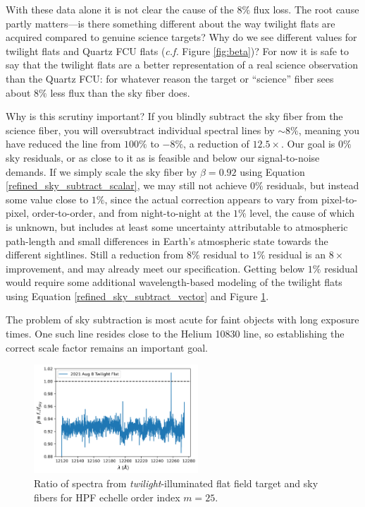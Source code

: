\documentclass[modern]{aastex631}
\begin{document}
With these data alone it is not clear the cause of the $8\%$ flux loss.  The root cause partly matters---is there something different about the way twilight flats are acquired compared to genuine science targets?  Why do we see different values for twilight flats and Quartz FCU flats (\emph{c.f.} Figure \ref{fig:beta})?  For now it is safe to say that the twilight flats are a better representation of a real science observation than the Quartz FCU: for whatever reason the target or ``science'' fiber sees about $8\%$ less flux than the sky fiber does.  

Why is this scrutiny important?  If you blindly subtract the sky fiber from the science fiber, you will oversubtract individual spectral lines by $\sim8\%$, meaning you have reduced the line from $100\%$ to $-8\%$, a reduction of $12.5\times$.  Our goal is $0\%$ sky residuals, or as close to it as is feasible and below our signal-to-noise demands.  If we simply scale the sky fiber by $\beta=0.92$ using Equation \ref{refined_sky_subtract_scalar}, we may still not achieve $0\%$ residuals, but instead some value close to $1\%$, since the actual correction appears to vary from pixel-to-pixel, order-to-order, and from night-to-night at the $1\%$ level, the cause of which is unknown, but includes at least some uncertainty attributable to atmospheric path-length and small differences in Earth's atmospheric state towards the different sightlines.  Still a reduction from $8\%$ residual to $1\%$ residual is an $8\times$ improvement, and may already meet our specification.  Getting below $1\%$ residual would require some additional wavelength-based modeling of the twilight flats using Equation \ref{refined_sky_subtract_vector} and Figure \ref{fig:beta_twilight}.

The problem of sky subtraction is most acute for faint objects with long exposure times.  One such line resides close to the Helium 10830 line, so establishing the correct scale factor remains an important goal.

\begin{figure}[ht]
  \centering
  \includegraphics[width=0.55\textwidth]{figures/HPF_twilight_2021Aug8.png}
\caption{Ratio of spectra from \emph{twilight}-illuminated flat field target and sky fibers for HPF echelle order index $m=25$.  }
\label{fig:beta_twilight}
\end{figure}
\end{document}
